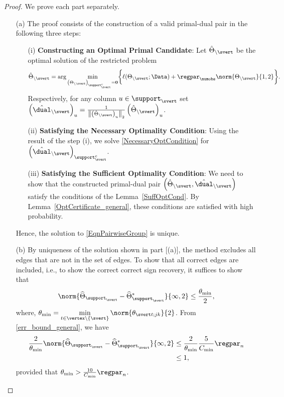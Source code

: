 \begin{proof}
We prove each part separately.
\begin{itemize}
\item [(a)] The proof consists of the construction of a valid primal-dual pair in the following three steps:
\begin{itemize}
\item [(i)] {\bf Constructing an Optimal Primal Candidate}: Let $\hat{\Theta}_{\backslash \svert}$ be the optimal solution of the restricted problem
\begin{equation}
\label{OracleEqnPairwiseGroup_general}
\hat{\Theta}_{\backslash \svert}=\arg\min_{\left(\Theta_{\backslash \svert}\right)_{\support_\svert^c}=\mathbf{0}} \biggr\{ \ell(\Theta_{\backslash \svert}; \Data) +
	\regpar_\numobs \norm{\Theta_{\backslash \svert}}{1,2}
	\biggr\}.
\end{equation}
Respectively, for any column $u\in\support_\svert$ set $\left(\hat{\dual}_{\backslash \svert}\right)_{u}=\frac{1}{\left\|\left(\hat{\Theta}_{\backslash \svert}\right)_u\right\|_2}\left(\hat{\Theta}_{\backslash \svert}\right)_u$.
\item [(ii)] {\bf Satisfying the Necessary Optimality Condition}: Using the result of the step (i), we solve \eqref{NecessaryOptCondition} for $\left(\hat{\dual}_{\backslash \svert}\right)_{\support_\svert^c}$.
\item [(iii)] {\bf Satisfying the Sufficient Optimality Condition}: We need to show that the constructed primal-dual pair $\left(\hat{\Theta}_{\backslash \svert},\hat{\dual}_{\backslash \svert}\right)$ satisfy the conditions of the Lemma~\ref{SuffOptCond}. By Lemma~\ref{OptCertificate_general}, these conditions are satisfied with high probability.
\end{itemize}
Hence, the solution to \eqref{EqnPairwiseGroup} is unique.\\
\item[(b)] By uniqueness of the solution shown in part [(a)], the method excludes all edges that are not in the set of edges. To show that all correct edges are included, i.e., to show the correct correct sign recovery, it suffices to show that
\begin{equation}
\norm{\widehat{\Theta}_{\support_\svert}-\widehat{\Theta}^*_{\support_\svert}}{\infty,2} \leq\frac{\theta_{\min}}{2},
\nonumber
\end{equation} 
where, $\displaystyle\theta_{\min}=\min_{t\in\vertex\backslash\{\svert\}}\norm{\theta_{\svert t;jk}}{2}$. From \eqref{err_bound_general}, we have
\begin{equation}
\begin{aligned}
\frac{2}{\theta_{\min}}\norm{\widehat{\Theta}_{\support_\svert}-\widehat{\Theta}^*_{\support_\svert}}{\infty,2}
&\leq\frac{2}{\theta_{\min}}\frac{5}{C_{\min}}\regpar_n\\
&\leq 1,
\end{aligned}
\nonumber
\end{equation}
provided that $\theta_{\min}>\frac{10}{C_{\min}}\regpar_n$.\\
\end{itemize}
\end{proof}

